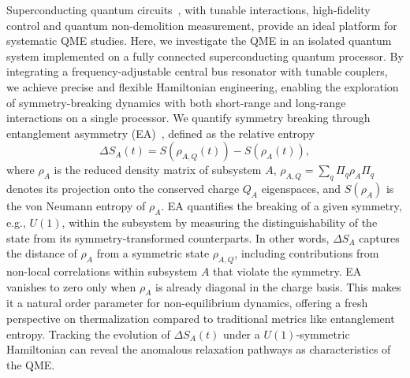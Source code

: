 \documentclass[reprint,superscriptaddress,preprintnumbers,longbibliography,
amsmath,amssymb,aps,floatfix,pra,twocolumn, tightenlines %
]{revtex4-2}
\begin{document}
Superconducting quantum circuits~\cite{2019_science,2024_science,2024_nature}, with tunable interactions, high-fidelity control and quantum non-demolition measurement, provide an ideal platform for systematic QME studies. Here, we investigate the QME in an isolated quantum system implemented on a fully connected superconducting quantum processor. By integrating a frequency-adjustable central bus resonator with tunable couplers, we achieve precise and flexible Hamiltonian engineering, enabling the exploration of symmetry-breaking dynamics with both short-range and long-range interactions on a single processor.
We quantify symmetry breaking through entanglement asymmetry (EA)~\cite{EA_probe}, defined as the relative entropy
\begin{equation}\label{EA}
\Delta S_A(t) = S(\rho_{A,Q}(t)) - S(\rho_A(t)),
\end{equation}
where \(\rho_A \) is the reduced density matrix of subsystem \(A\), \(\rho_{A,Q} = \sum_q \Pi_q \rho_A \Pi_q\) denotes its projection onto the conserved charge \(Q_A\) eigenspaces, and \(S(\rho_A)\) is the von Neumann entropy of $\rho_A$. EA quantifies the breaking of a given symmetry, e.g., $ U(1) $, within the subsystem by measuring the distinguishability of the state from its symmetry-transformed counterparts. In other words, \(\Delta S_A\) captures the distance of \(\rho_A\) from a symmetric state \(\rho_{A,Q}\), including contributions from non-local correlations within subsystem \(A\) that violate the symmetry. EA vanishes to zero only when \(\rho_A\) is already diagonal in the charge basis. This makes it a natural order parameter for non-equilibrium dynamics, offering a fresh perspective on thermalization compared to traditional metrics like entanglement entropy. Tracking the evolution of \(\Delta S_{A}(t)\) under a \(U(1)\)-symmetric Hamiltonian can reveal the anomalous relaxation pathways as characteristics of the QME.   
\end{document}
